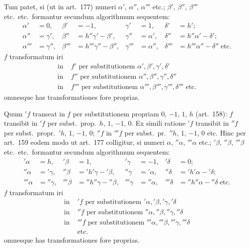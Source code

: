 \documentclass[12pt,a4paper]{article}
\theoremstyle{plain}
\begin{document}
Tum patet, si (ut in art.~177) numeri $\alpha'$, $\alpha''$, $\alpha'''$ etc.; $\beta'$, $\beta''$, $\beta'''$ etc.~etc.~formantur secundum algorithmum sequentem:
\[
\begin{aligned}
\alpha' &= 0, & \beta' &= -1, & \gamma' &= 1, & \delta' &= h';\\
\alpha'' &= \gamma', & \beta'' &= h''\gamma' - \beta', & \gamma'' &= \alpha', & \delta'' &= h''\alpha' - \delta';\\
\alpha''' &= \gamma'', & \beta''' &= h'''\gamma'' - \beta'', & \gamma''' &= \alpha'', & \delta''' &= h'''\alpha'' - \delta'' \; \text{etc.}
\end{aligned}
\]
$f$ transformatum iri
\begin{align*}
\text{in } &f' \text{ per substitutionem } \alpha', \beta', \gamma', \delta'\\
\text{in } &f'' \text{ per substitutionem } \alpha'', \beta'', \gamma'', \delta''\\
\text{in } &f''' \text{ per substitutionem } \alpha''', \beta''', \gamma''', \delta''' \text{ etc.}
\end{align*}
omnesque has transformationes fore proprias.

Quum $'f$ transeat in $f$ per substitutionem propriam $0$, $-1$, $1$, $h$ (art.~158): $f$ transibit in $'f$ per subst.~prop.~$h$, $1$, $-1$, $0$. Ex simili ratione $'f$ transibit in $''f$ per subst.~propr.~$'h$, $1$, $-1$, $0$; $''f$ in $'''f$ per subst.~pr.~$''h$, $1$, $-1$, $0$ etc. Hinc per art.~159 eodem modo ut art.~177 colligitur, si numeri $\alpha$, $''\alpha$, $'''\alpha$ etc.; $'\beta$, $''\beta$, $'''\beta$ etc.~etc.~formantur secundum algorithmum sequentem:
\[
\begin{aligned}
'\alpha &= h, & '\beta &= 1, & '\gamma &= -1, & '\delta &= 0;\\
''\alpha &= '\gamma, & ''\beta &= 'h'\gamma - '\beta, & ''\gamma &= '\alpha, & ''\delta &= 'h'\alpha - '\delta;\\
'''\alpha &= ''\gamma, & '''\beta &= ''h''\gamma - ''\beta, & '''\gamma &= ''\alpha, & '''\delta &= ''h''\alpha - ''\delta \; \text{etc.}
\end{aligned}
\]
$f$ transformatum iri
\begin{align*}
\text{in } &'f \text{ per substitutionem } '\alpha, '\beta, '\gamma, '\delta\\
\text{in } &''f \text{ per substitutionem } ''\alpha, ''\beta, ''\gamma, ''\delta\\
\text{in } &'''f \text{ per substitutionem } '''\alpha, '''\beta, '''\gamma, '''\delta\\
&\text{etc.}
\end{align*}
omnesque has transformationes fore proprias.
\end{document}

